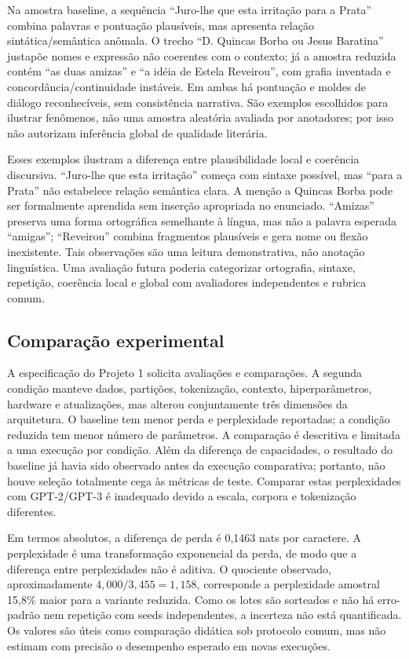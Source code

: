 \documentclass[conference]{IEEEtran}
\begin{document}
Na amostra baseline, a sequência “Juro-lhe que esta irritação para a Prata” combina palavras e pontuação plausíveis, mas apresenta relação sintática/semântica anômala. O trecho “D. Quincas Borba ou Jesus Baratina” justapõe nomes e expressão não coerentes com o contexto; já a amostra reduzida contém “as duas amizas” e “a idéia de Estela Reveirou”, com grafia inventada e concordância/continuidade instáveis. Em ambas há pontuação e moldes de diálogo reconhecíveis, sem consistência narrativa. São exemplos escolhidos para ilustrar fenômenos, não uma amostra aleatória avaliada por anotadores; por isso não autorizam inferência global de qualidade literária.

Esses exemplos ilustram a diferença entre plausibilidade local e coerência discursiva. “Juro-lhe que esta irritação” começa com sintaxe possível, mas “para a Prata” não estabelece relação semântica clara. A menção a Quincas Borba pode ser formalmente aprendida sem inserção apropriada no enunciado. “Amizas” preserva uma forma ortográfica semelhante à língua, mas não a palavra esperada “amigas”; “Reveirou” combina fragmentos plausíveis e gera nome ou flexão inexistente. Tais observações são uma leitura demonstrativa, não anotação linguística. Uma avaliação futura poderia categorizar ortografia, sintaxe, repetição, coerência local e global com avaliadores independentes e rubrica comum.

\subsection{Comparação experimental}

A especificação do Projeto 1 solicita avaliações e comparações. A segunda condição manteve dados, partições, tokenização, contexto, hiperparâmetros, hardware e atualizações, mas alterou conjuntamente três dimensões da arquitetura. O baseline tem menor perda e perplexidade reportadas; a condição reduzida tem menor número de parâmetros. A comparação é descritiva e limitada a uma execução por condição. Além da diferença de capacidades, o resultado do baseline já havia sido observado antes da execução comparativa; portanto, não houve seleção totalmente cega às métricas de teste. Comparar estas perplexidades com GPT-2/GPT-3 é inadequado devido a escala, corpora e tokenização diferentes.

Em termos absolutos, a diferença de perda é 0,1463 nats por caractere. A perplexidade é uma transformação exponencial da perda, de modo que a diferença entre perplexidades não é aditiva. O quociente observado, aproximadamente $4{,}000/3{,}455=1{,}158$, corresponde a perplexidade amostral 15,8\% maior para a variante reduzida. Como os lotes são sorteados e não há erro-padrão nem repetição com seeds independentes, a incerteza não está quantificada. Os valores são úteis como comparação didática sob protocolo comum, mas não estimam com precisão o desempenho esperado em novas execuções.
\end{document}
